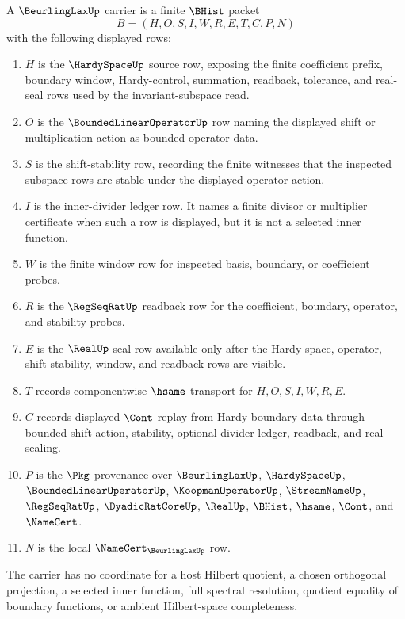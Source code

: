 \begin{definition}
\label{def:beurling-lax-carrier}
A $\BeurlingLaxUp$ carrier is a finite $\BHist$ packet
$$
B=(H,O,S,I,W,R,E,T,C,P,N)
$$
with the following displayed rows:
\begin{enumerate}
\item $H$ is the $\HardySpaceUp$ source row, exposing the finite coefficient prefix, boundary window, Hardy-control, summation, readback, tolerance, and real-seal rows used by the invariant-subspace read.
\item $O$ is the $\BoundedLinearOperatorUp$ row naming the displayed shift or multiplication action as bounded operator data.
\item $S$ is the shift-stability row, recording the finite witnesses that the inspected subspace rows are stable under the displayed operator action.
\item $I$ is the inner-divider ledger row. It names a finite divisor or multiplier certificate when such a row is displayed, but it is not a selected inner function.
\item $W$ is the finite window row for inspected basis, boundary, or coefficient probes.
\item $R$ is the $\RegSeqRatUp$ readback row for the coefficient, boundary, operator, and stability probes.
\item $E$ is the $\RealUp$ seal row available only after the Hardy-space, operator, shift-stability, window, and readback rows are visible.
\item $T$ records componentwise $\hsame$ transport for $H,O,S,I,W,R,E$.
\item $C$ records displayed $\Cont$ replay from Hardy boundary data through bounded shift action, stability, optional divider ledger, readback, and real sealing.
\item $P$ is the $\Pkg$ provenance over $\BeurlingLaxUp$, $\HardySpaceUp$, $\BoundedLinearOperatorUp$, $\KoopmanOperatorUp$, $\StreamNameUp$, $\RegSeqRatUp$, $\DyadicRatCoreUp$, $\RealUp$, $\BHist$, $\hsame$, $\Cont$, and $\NameCert$.
\item $N$ is the local $\NameCert_{\BeurlingLaxUp}$ row.
\end{enumerate}
The carrier has no coordinate for a host Hilbert quotient, a chosen orthogonal projection, a selected inner function, full spectral resolution, quotient equality of boundary functions, or ambient Hilbert-space completeness.
\end{definition}


